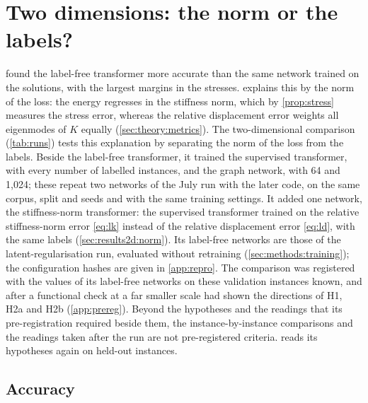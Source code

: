 \section{Two dimensions: the norm or the labels?}\label{sec:results2d}

 found the label-free transformer more accurate than the same network
trained on the solutions, with the largest margins in the stresses. 
explains this by the norm of the loss: the energy regresses in the stiffness norm, which by
\cref{prop:stress} measures the stress error, whereas the relative displacement error
weights all eigenmodes of $K$ equally (\cref{sec:theory:metrics}). The two-dimensional
comparison (\cref{tab:runs}) tests this explanation by separating the norm of the loss from
the labels. Beside the label-free transformer, it trained the supervised transformer, with
every number of labelled instances, and the graph network, with 64 and 1,024; these repeat
two networks of the July run with the later code, on the same corpus, split and seeds and
with the same training settings. It added one network, the stiffness-norm transformer: the
supervised transformer trained on the relative stiffness-norm error \eqref{eq:lk} instead of
the relative displacement error \eqref{eq:ld}, with the same labels
(\cref{sec:results2d:norm}). Its label-free networks are those of the latent-regularisation
run, evaluated without retraining (\cref{sec:methods:training}); the configuration hashes
are given in \ref{app:repro}. The comparison was registered with the values of its
label-free networks on these validation instances known, and after a functional check at a
far smaller scale had shown the directions of H1, H2a and H2b (\ref{app:prereg}). Beyond the
hypotheses and the readings that its pre-registration required beside them, the
instance-by-instance comparisons and the readings taken after the run are not pre-registered
criteria.  reads its hypotheses again on held-out instances.

\subsection{Accuracy}\label{sec:results2d:accuracy}



